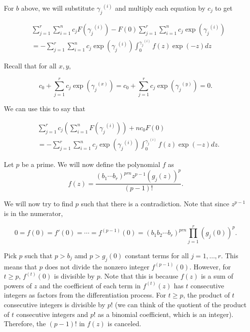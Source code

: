 \documentclass[a4paper, 11pt]{book}
\begin{document}
{    For $b$ above, we will substitute ${\gamma_j}^{(i)}$ and multiply each equation by $c_j$ to get

\begin{align*}
    &\sum\limits_{j=1}^{r} \sum\limits_{i=1}^{n} c_j F({\gamma_j}^{(i)}) - F(0) \sum\limits_{j=1}^{r} \sum\limits_{i=1}^{n} c_j\exp\left({\gamma_j}^{(i)}\right) \\
    &= - \sum\limits_{j=1}^{r} \sum\limits_{i=1}^{n} c_j\exp\left({\gamma_j}^{(i)}\right) \int_{0}^{{\gamma_j}^{(i)}} f(z) \exp(-z) dz
\end{align*}

    Recall that for all $x, y$,

    \[c_0 + \sum\limits_{j=1}^{r} c_j\exp({\gamma_j}^{(x)}) = c_0 + \sum\limits_{j=1}^{r} c_j\exp({\gamma_j}^{(y)}) = 0.\]

    We can use this to say that

    \begin{align*}
    &\sum\limits_{j=1}^{r}c_j\left(\sum\limits_{i=1}^{n} F({\gamma_j}^{(i)})\right) + nc_0F(0) \\
    &= - \sum\limits_{j=1}^{r} \sum\limits_{i=1}^{n} c_j\exp\left({\gamma_j}^{(i)}\right) \int_{0}^{{\gamma_j}^{(i)}} f(z) \exp(-z) dz.
    \end{align*}

    Let $p$ be a prime. We will now define the polynomial $f$ as 
    \[f(z) = \frac{{(b_1\cdots b_r)}^{prn}z^{p-1}{\left(g_j(z)\right)}^{p}}{(p-1)!}.\]

    We will now try to find $p$ such that there is a contradiction. Note that since $z^{p-1}$ is in the numerator, 

    \[0 = f(0) = f'(0) = \cdots = f^{(p-1)}(0) = {(b_1b_2\cdots b_r)}^{prn}\prod\limits_{j=1}^{r} {\left(g_j(0)\right)}^{p}.\]

    Pick $p$ such that $p > b_j$ amd $p > g_j(0)$ constant terms for all $j = 1, \ldots, r$. This means that $p$ does not divide the nonzero integer $f^{(p-1)}(0)$. However, for $t \geq p$, $f^{(t)}(0)$ is divisible by $p$. Note that this is because $f(z)$ is a sum of powers of $z$ and the coefficient of each term in $f^{(t)}(z)$ has $t$ consecutive integers as factors from the differentiation process. For $t \geq p$, the product of $t$ consecutive integers is divisible by ${p!}$ (we can think of the quotient of the product of $t$ consecutive integers and ${p!}$ as a binomial coefficient, which is an integer). Therefore, the ${(p-1)!}$ in $f(z)$ is canceled.\par

}
\end{document}
